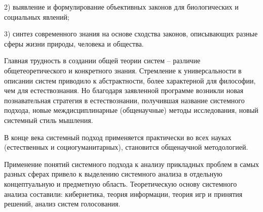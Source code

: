 \documentclass[exam_answers.tex]{subfiles}
\begin{document}
2) выявление и формулирование объективных законов для биологических и социальных явлений;

3) синтез современного знания на основе сходства законов, описывающих разные сферы жизни природы, человека и общества.

Главная трудность в создании общей теории систем – различие общетеоретического и конкретного знания.
Стремление к универсальности в описании систем приводило к абстрактности, более характерной для философии, чем для естествознания.
Но благодаря заявленной программе возникли новая познавательная стратегия в естествознании, получившая название системного подхода, новые междисциплинарные (общенаучные) методы исследования, новый системный стиль мышления.

В конце века системный подход применяется практически во всех науках (естественных и социогуманитарных), становится общенаучной методологией.

Применение понятий системного подхода к анализу прикладных проблем в самых разных сферах привело к выделению системного анализа в отдельную концептуальную и предметную область.
Теоретическую основу системного анализа составили: кибернетика, теория информации, теория игр и принятия решений, анализ систем голосования.
\end{document}
